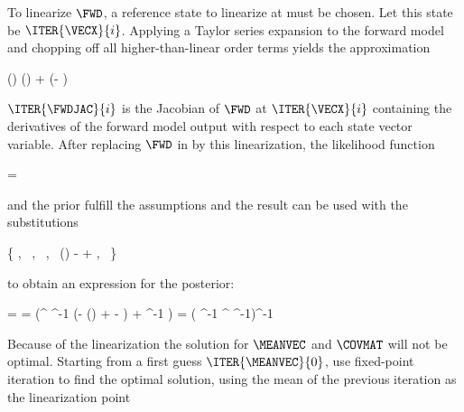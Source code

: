     \startsubsection[title=Iterative Solutions]

        To linearize $\FWD$, a reference state to linearize at must be chosen.
        Let this state be $\ITER{\VECX}{i}$. Applying a Taylor series
        expansion to the forward model and chopping off all higher-than-linear
        order terms yields the approximation

        \startformula
            \FWD(\VECX) \approx \FWD()
                +  (\VECX - ) \EQSTOP
        \stopformula

        $\ITER{\FWDJAC}{i}$ is the Jacobian of $\FWD$ at $\ITER{\VECX}{i}$
        containing the derivatives of the forward model output with respect
        to each state vector variable. After replacing $\FWD$ in
         by this linearization, the likelihood
        function

        \startformula
            \LIKELIHOOD = 
        \stopformula

        and the prior  fulfill the assumptions
         and the result  can be used
        with the substitutions

        \startformula
            \{ \VECA \rightarrow \MEANVECA,~
            \MATPI \rightarrow \COVMATA,~
            \MATB \rightarrow {},~
            \VECB \rightarrow \FWD()
                -  
                + \MEANVECERR,~
            \MATQI \rightarrow \COVMATERR \}
        \stopformula

        to obtain an expression for the posterior:
        
        \startformula
        \startalign[n=2,align={right,left}]
            \NC \POSTERIOR = \NC \GAUSS{\VECX}{\MEANVEC}{\COVMAT} \NR
            \NC \MEANVEC = \NC \COVMAT (^\top
                \COVMATERR^{-1} (\VECY - \FWD()
                +   - \MEANVECERR)
                + \COVMATA^{-1} \MEANVECA) \NR
            \NC \COVMAT = \NC 
                ( \COVMATERR^{-1} ^\top
                \COVMATA^{-1})^{-1} \NR
        \stopalign
        \stopformula
        
        Because of the linearization the solution for $\MEANVEC$ and $\COVMAT$
        will not be optimal. Starting from a first guess $\ITER{\MEANVEC}{0}$,
        use fixed-point iteration to find the optimal solution, using the mean
        of the previous iteration as the linearization point

